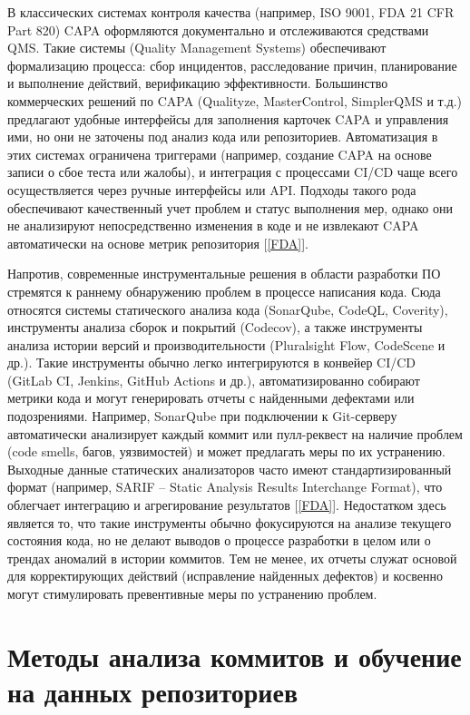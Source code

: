 В классических системах контроля качества (например, ISO 9001, FDA 21 CFR Part 820) CAPA оформляются документально и отслеживаются средствами QMS. Такие системы (Quality Management Systems) обеспечивают формализацию процесса: сбор инцидентов, расследование причин, планирование и выполнение действий, верификацию эффективности. Большинство коммерческих решений по CAPA (Qualityze, MasterControl, SimplerQMS и т.д.) предлагают удобные интерфейсы для заполнения карточек CAPA и управления ими, но они не заточены под анализ кода или репозиториев. Автоматизация в этих системах ограничена триггерами (например, создание CAPA на основе записи о сбое теста или жалобы), и интеграция с процессами CI/CD чаще всего осуществляется через ручные интерфейсы или API. Подходы такого рода обеспечивают качественный учет проблем и статус выполнения мер, однако они не анализируют непосредственно изменения в коде и не извлекают CAPA автоматически на основе метрик репозитория [\ref{FDA}].

Напротив, современные инструментальные решения в области разработки ПО стремятся к раннему обнаружению проблем в процессе написания кода. Сюда относятся системы статического анализа кода (SonarQube, CodeQL, Coverity), инструменты анализа сборок и покрытий (Codecov), а также инструменты анализа истории версий и производительности (Pluralsight Flow, CodeScene и др.). Такие инструменты обычно легко интегрируются в конвейер CI/CD (GitLab CI, Jenkins, GitHub Actions и др.), автоматизированно собирают метрики кода и могут генерировать отчеты с найденными дефектами или подозрениями. Например, SonarQube при подключении к Git-серверу автоматически анализирует каждый коммит или пулл-реквест на наличие проблем (code smells, багов, уязвимостей) и может предлагать меры по их устранению. Выходные данные статических анализаторов часто имеют стандартизированный формат (например, SARIF – Static Analysis Results Interchange Format), что облегчает интеграцию и агрегирование результатов [\ref{FDA}]. Недостатком здесь является то, что такие инструменты обычно фокусируются на анализе текущего состояния кода, но не делают выводов о процессе разработки в целом или о трендах аномалий в истории коммитов. Тем не менее, их отчеты служат основой для корректирующих действий (исправление найденных дефектов) и косвенно могут стимулировать превентивные меры по устранению проблем.

\section{Методы анализа коммитов и обучение на данных репозиториев} \label{ch1:sec3}
